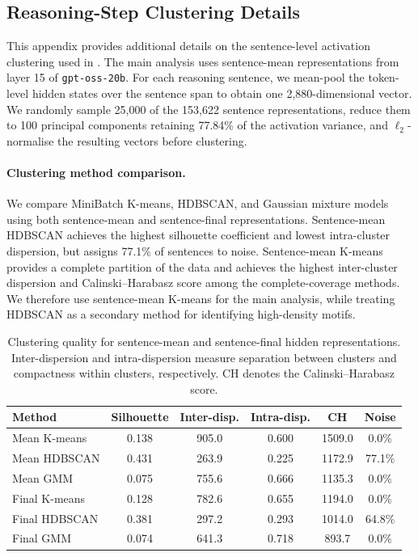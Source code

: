 \documentclass{article}
\begin{document}
\subsection{Reasoning-Step Clustering Details}
\label{app:reasoning-clustering}

This appendix provides additional details on the sentence-level activation
clustering used in . The main analysis uses
sentence-mean representations from layer 15 of \texttt{gpt-oss-20b}. For
each reasoning sentence, we mean-pool the token-level hidden states over the
sentence span to obtain one 2,880-dimensional vector. We randomly sample
25,000 of the 153,622 sentence representations, reduce them to 100 principal
components retaining 77.84\% of the activation variance, and
$\ell_2$-normalise the resulting vectors before clustering.

\paragraph{Clustering method comparison.}
We compare MiniBatch K-means, HDBSCAN, and Gaussian mixture models using both
sentence-mean and sentence-final representations. Sentence-mean HDBSCAN
achieves the highest silhouette coefficient and lowest intra-cluster
dispersion, but assigns 77.1\% of sentences to noise. Sentence-mean K-means
provides a complete partition of the data and achieves the highest
inter-cluster dispersion and Calinski--Harabasz score among the
complete-coverage methods. We therefore use sentence-mean K-means for the
main analysis, while treating HDBSCAN as a secondary method for identifying
high-density motifs.


\begin{table}[htbp]
\centering
\small
\begin{tabular}{lccccc}
\toprule
Method & Silhouette & Inter-disp. & Intra-disp. & CH & Noise \\
\midrule
Mean K-means     & 0.138 & 905.0 & 0.600 & 1509.0 & 0.0\% \\
Mean HDBSCAN     & 0.431 & 263.9 & 0.225 & 1172.9 & 77.1\% \\
Mean GMM         & 0.075 & 755.6 & 0.666 & 1135.3 & 0.0\% \\
Final K-means    & 0.128 & 782.6 & 0.655 & 1194.0 & 0.0\% \\
Final HDBSCAN    & 0.381 & 297.2 & 0.293 & 1014.0 & 64.8\% \\
Final GMM        & 0.074 & 641.3 & 0.718 & 893.7 & 0.0\% \\
\bottomrule
\end{tabular}
\caption{Clustering quality for sentence-mean and sentence-final hidden
representations. Inter-dispersion and intra-dispersion measure separation
between clusters and compactness within clusters, respectively. CH denotes
the Calinski--Harabasz score.}
\label{tab:reasoning-clustering}
\end{table}
\end{document}
